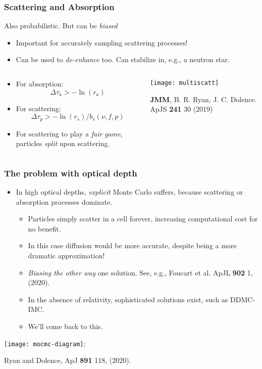 \documentclass[]{beamer}
\begin{document}
\begin{frame}
  \frametitle{Scattering and Absorption}
  Also probabilistic. But can be \textit{biased}
  \begin{itemize}
  \item Important for accurately sampling scattering processes!
  \item Can be used to \textit{de-enhance} too. Can stabilize in, e.g., a neutron star.
  \end{itemize}
  \begin{columns}
    \begin{column}{5cm}
      \begin{itemize}
      \item For absorption:
        $$\Delta \tau_a > - \ln(r_a)$$
      \item For scattering:
        $$\Delta \tau_p > -\ln(r_s)/b_s(\nu, f, p)$$
      \item For scattering to play a \textit{fair game}, particles
        \textit{split} upon scattering.
      \end{itemize}
    \end{column}
    \begin{column}{7cm}
      \begin{center}
        \texttt{[image: multiscatt]}
      \end{center}
      {\tiny \textbf{JMM}, B. R. Ryan, J. C. Dolence. ApJS \textbf{241} 30 (2019)}
    \end{column}
  \end{columns}
\end{frame}

\begin{frame}
  \frametitle{The problem with optical depth}
  \begin{itemize}
  \item In high optical depths, \textit{explicit} Monte Carlo suffers, because scattering or absorption processes dominate.
    \begin{itemize}
    \item Particles simply scatter in a cell forever, increasing computational cost for no benefit.
    \item In this case diffusion would be more accurate, despite being a more dramatic approximation!
    \item \textit{Biasing the other way}  one solution. See, e.g., Foucart et al. ApJL \textbf{902} 1, (2020).
    \item In the absence of relativity, sophisticated solutions exist, such as DDMC-IMC.
    \item We'll come back to this.
    \end{itemize}
  \end{itemize}
  \begin{center}
    \texttt{[image: mocmc-diagram]};
  \end{center}
  {\footnotesize Ryan and Dolence, ApJ \textbf{891} 118, (2020).}  
\end{frame}
\end{document}
